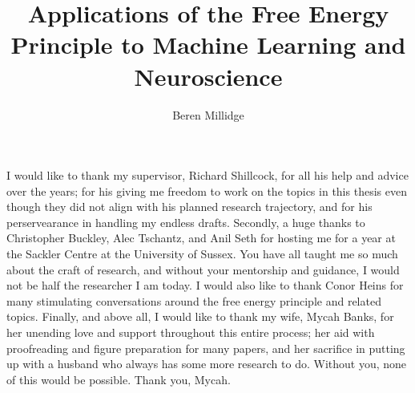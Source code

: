 \documentclass[phd,ianc,oneside,logo,doublespacing,sansheadings,romanprepages,parskip]{infthesis}
\title{Applications of the Free Energy Principle to Machine Learning and Neuroscience}
\author{Beren Millidge}
\begin{document}
\begin{preliminary}

\maketitle

\begin{acknowledgements}
I would like to thank my supervisor, Richard Shillcock, for all his help and advice over the years; for his giving me freedom to work on the topics in this thesis even though they did not align with his planned research trajectory, and for his perservearance in handling my endless drafts. Secondly, a huge thanks to Christopher Buckley, Alec Tschantz, and Anil Seth for hosting me for a year at the Sackler Centre at the University of Sussex.  You have all taught me so much about the craft of research, and without your mentorship and guidance, I would not be half the researcher I am today. I would also like to thank Conor Heins for many stimulating conversations around the free energy principle and related topics.  Finally, and above all, I would like to thank my wife, Mycah Banks, for her unending love and support throughout this entire process; her aid with proofreading and figure preparation for many papers, and her sacrifice in putting up with a husband who always has some more research to do. Without you, none of this would be possible. Thank you, Mycah.
\end{acknowledgements}

\standarddeclaration


\tableofcontents

 \listoffigures

\end{preliminary}










\appendix







\end{document}
